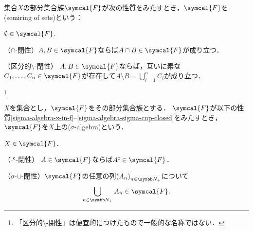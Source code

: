 \documentclass[main.tex]{subfiles}
\begin{document}
\begin{thmbox}
\begin{definition}
集合\(X\)の部分集合族\(\symcal{F}\)が次の性質をみたすとき，\(\symcal{F}\)を(semiring of sets)という：
\begin{conditions}
    \item\label{semiring-emptyset} \(\emptyset \in \symcal{F}\).
    \item （\(\mathord{\cap}\)-閉性）\(A, B \in \symcal{F}\)ならば\(A \cap B \in \symcal{F}\)が成り立つ．
    \item\label{semiring-setminus}（区分的\(\mathord{\setminus}\)-閉性\footnotemark）
        \(A, B \in \symcal{F}\)ならば，互いに素な\(C_1, \ldots, C_n \in \symcal{F}\)が存在して\(A \setminus B = \bigcup_{i = 1}^n C_i\)が成り立つ．
\end{conditions}
\end{definition}
\end{thmbox}

\footnote{「区分的\(\mathord{\setminus}\)-閉性」は便宜的につけたもので一般的な名称ではない．}

\begin{thmbox}
\begin{definition}
\(X\)を集合とし，\(\symcal{F}\)をその部分集合族とする．
\(\symcal{F}\)が以下の性質\ref{sigma-algebra-x-in-f}--\ref{sigma-algebra-sigma-cup-closed}をみたすとき，
\(\symcal{F}\)を\(X\)上の(\(\sigma\)-algebra)という{\footnotemark}．
\begin{conditions}
    \item\label{sigma-algebra-x-in-f}
        \(X \in \symcal{F}\)．
    \item\label{sigma-algebra-comp-closed} （\({\mathord{\cdot}}^{\mathsf{c}}\)-閉性） \(A \in \symcal{F}\)ならば\(\setcomp{A} \in \symcal{F}\)．
    \item\label{sigma-algebra-sigma-cup-closed} （\(\sigma\)-\(\mathord{\cup}\)-閉性）\(\symcal{F}\)の任意の列\(\Sequence{A}\)について
        \begin{align*}
            \bigcup_{n \in \PositiveInteger} A_n \in \symcal{F}.
        \end{align*}
\end{conditions}
\end{definition}
\end{thmbox}

\end{document}
